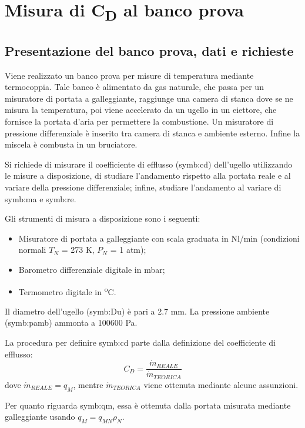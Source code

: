 \section{Misura di C\textsubscript{D} al banco prova}

\subsection{Presentazione del banco prova, dati e richieste}
Viene realizzato un banco prova per misure di temperatura mediante termocoppia. Tale banco è alimentato da gas naturale, che passa per un misuratore di portata a galleggiante, raggiunge una camera di stanca dove se ne misura la temperatura, poi viene accelerato da un ugello in un eiettore, che fornisce la portata d'aria per permettere la combustione. Un misuratore di pressione differenziale è inserito tra camera di stanca e ambiente esterno. Infine la miscela è combusta in un bruciatore. 

Si richiede di misurare il coefficiente di efflusso (\gls{symb:cd}) dell'ugello utilizzando le misure a disposizione, di studiare l'andamento rispetto alla portata reale e al variare della pressione differenziale; infine, studiare l'andamento al variare di \gls{symb:ma} e \gls{symb:re}.

Gli strumenti di misura a disposizione sono i seguenti:
\begin{itemize}
	\item Misuratore di portata a galleggiante con scala graduata in Nl/min (condizioni normali $T_N$ = 273 K, $P_N$ = 1 atm);
	\item Barometro differenziale digitale in mbar;
	\item Termometro digitale in \textsuperscript{o}C.
\end{itemize}

Il diametro dell'ugello (\gls{symb:Du}) è pari a 2.7 mm. La pressione ambiente (\gls{symb:pamb}) ammonta a 100600 Pa.

La procedura per definire \gls{symb:cd} parte dalla definizione del coefficiente di efflusso:
\begin{equation}
	C_D=\frac{\dot{m}_\textit{REALE}}{\dot{m}_\textit{TEORICA}}
\end{equation}
dove $\dot{m}_\textit{REALE} = q_M$, mentre $\dot{m}_\textit{TEORICA}$ viene ottenuta mediante alcune assunzioni. 

Per quanto riguarda \gls{symb:qm}, essa è ottenuta dalla portata misurata mediante galleggiante usando $q_M=q_{MN} \rho_N$.

